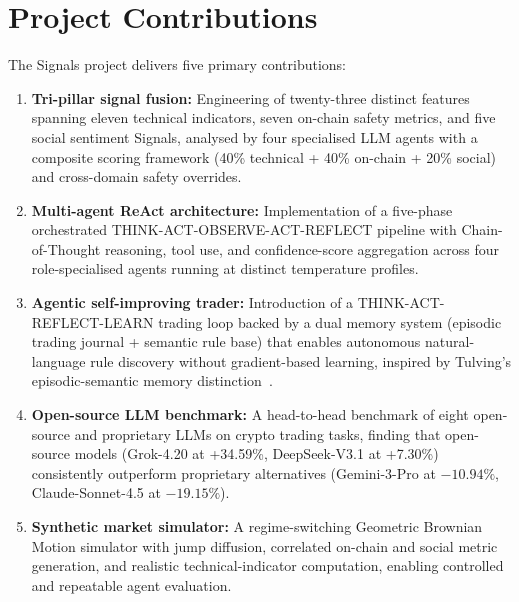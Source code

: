 \documentclass[12pt,a4paper,oneside,openany]{book}
\begin{document}
\section{Project Contributions}
The Signals project delivers five primary contributions:

\begin{enumerate}[leftmargin=12mm]
\item \textbf{Tri-pillar signal fusion:} Engineering of twenty-three distinct features spanning eleven technical indicators, seven on-chain safety metrics, and five social sentiment Signals, analysed by four specialised LLM agents with a composite scoring framework (40\% technical + 40\% on-chain + 20\% social) and cross-domain safety overrides.

\item \textbf{Multi-agent ReAct architecture:} Implementation of a five-phase orchestrated THINK-ACT-OBSERVE-ACT-REFLECT pipeline with Chain-of-Thought reasoning, tool use, and confidence-score aggregation across four role-specialised agents running at distinct temperature profiles.

\item \textbf{Agentic self-improving trader:} Introduction of a THINK-ACT-REFLECT-LEARN trading loop backed by a dual memory system (episodic trading journal + semantic rule base) that enables autonomous natural-language rule discovery without gradient-based learning, inspired by Tulving's episodic-semantic memory distinction~\cite{ref45}.

\item \textbf{Open-source LLM benchmark:} A head-to-head benchmark of eight open-source and proprietary LLMs on crypto trading tasks, finding that open-source models (Grok-4.20 at +34.59\%, DeepSeek-V3.1 at +7.30\%) consistently outperform proprietary alternatives (Gemini-3-Pro at $-10.94\%$, Claude-Sonnet-4.5 at $-19.15\%$).

\item \textbf{Synthetic market simulator:} A regime-switching Geometric Brownian Motion simulator with jump diffusion, correlated on-chain and social metric generation, and realistic technical-indicator computation, enabling controlled and repeatable agent evaluation.
\end{enumerate}
\end{document}
